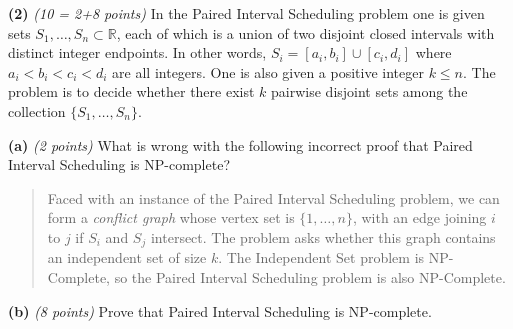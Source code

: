 \documentclass[11pt]{article}
\def\bigap{0.25in}
\begin{document}
\setlength{\parindent}{0in}
\addtolength{\parskip}{0.1cm}
\setlength{\fboxrule}{.5mm}\setlength{\fboxsep}{1.2mm}
\newlength{\boxlength}\setlength{\boxlength}{\textwidth}
\addtolength{\boxlength}{-4mm}
\begin{center}
\end{center}
\vspace{5mm}

{\bf (2)} {\em (10 = 2+8 points)}
In the {\sc Paired Interval Scheduling} problem one is given sets
$S_1,\ldots,S_n \subset \mathbb{R}$, each of which is a union
of two disjoint closed intervals with distinct integer 
endpoints. In other words, $S_i = [a_i,b_i] \cup [c_i,d_i]$
where $a_i < b_i < c_i < d_i$ are all integers. One is also
given a positive integer $k \le n$. The problem is to decide
whether there exist $k$ pairwise disjoint sets among the 
collection $\{S_1,\ldots,S_n\}$. 

{\bf (a)} {\em (2 points)} 
What is wrong with the following incorrect proof that 
{\sc Paired Interval Scheduling} is NP-complete?
\begin{quotation}
\noindent Faced with an instance of the {\sc Paired Interval
Scheduling} problem, we can form a \emph{conflict graph} whose
vertex set is $\{1,\ldots,n\}$, 
with an edge joining $i$ to $j$ if $S_i$ and $S_j$
intersect. The problem asks whether this
graph contains an independent set of size $k$.  The
{\sc Independent Set} problem is NP-Complete, so the
{\sc Paired Interval Scheduling} problem is also NP-Complete.
\end{quotation}

{\bf (b)} {\em (8 points)} Prove that 
{\sc Paired Interval Scheduling} is NP-complete.

\vskip \bigap

\end{document}
